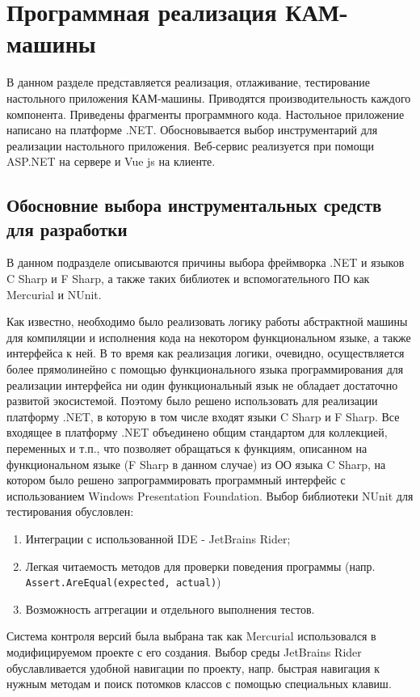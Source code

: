 \chapter{Программная реализация КАМ-машины}

\begin{annotation}
	В данном разделе представляется реализация, отлаживание, тестирование настольного приложения КАМ-машины.
	Приводятся производительность каждого компонента. Приведены фрагменты программного кода. Настольное приложение написано на платформе .NET. Обосновывается выбор инструментарий для реализации настольного приложения. Веб-сервис реализуется при помощи ASP.NET на сервере и Vue js на клиенте.
\end{annotation}

\section{Обосновние выбора инструментальных средств для разработки}

\begin{annotation}
	В данном подразделе описываются причины выбора фреймворка .NET и языков C Sharp и F Sharp, а также таких библиотек и вспомогательного ПО как Mercurial и NUnit.
\end{annotation}

Как известно, необходимо было реализовать логику работы абстрактной машины для компиляции и исполнения кода на некотором функциональном языке, а также интерфейса к ней. В то время как реализация логики, очевидно, осуществляется более прямолинейно с помощью функционального языка программирования для реализации интерфейса ни один функциональный язык не обладает достаточно развитой экосистемой. Поэтому было решено использовать для реализации платформу .NET, в которую в том числе входят языки C Sharp и F Sharp. Все входящее в платформу .NET объединено общим стандартом для коллекцией, переменных и т.п., что позволяет обращаться к функциям, описанном на функциональном языке (F Sharp в данном случае) из ОО языка C Sharp, на котором было решено запрограммировать программный интерфейс с использованием Windows Presentation Foundation.
Выбор библиотеки NUnit для тестирования обусловлен:
\begin{enumerate}
	\item Интеграции с использованной IDE - JetBrains Rider;
	\item Легкая читаемость методов для проверки поведения программы (напр. \verb|Assert.AreEqual(expected, actual)|)
	\item Возможность аггрегации и отдельного выполнения тестов.
\end{enumerate}
Система контроля версий была выбрана так как Mercurial использовался в модифицируемом проекте с его создания. Выбор среды JetBrains Rider обуславливается удобной навигации по проекту, напр. быстрая навигация к нужным методам и поиск потомков классов с помощью специальных клавиш.

